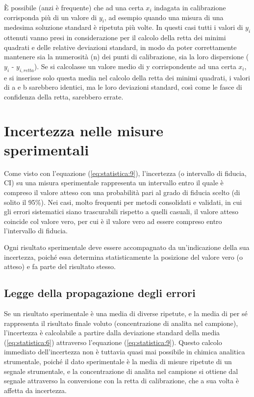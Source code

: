 
È possibile (anzi è frequente) che ad una certa $x_i$ indagata in calibrazione corrisponda più di un valore di $y_i$, ad esempio quando una misura di una medesima soluzione standard è ripetuta più volte. In questi casi tutti i valori di $y_i$ ottenuti vanno presi in considerazione per il calcolo della retta dei minimi quadrati e delle relative deviazioni standard, in modo da poter correttamente mantenere sia la numerosità (n) dei punti di calibrazione, sia la loro dispersione ($y_i$ - $y_{i,retta}$). Se si calcolasse un valore medio di y corrispondente ad una certa $x_i$, e si inserisse solo questa media nel calcolo della retta dei minimi quadrati, i valori di a e b sarebbero identici, ma le loro deviazioni standard, così come le fasce di confidenza della retta, sarebbero errate.

\section{Incertezza nelle misure sperimentali}

Come visto con l'equazione (\ref{eq:statistica:9}), l'incertezza (o intervallo di fiducia, CI) su una misura sperimentale rappresenta un intervallo entro il quale è compreso il valore atteso con una probabilità pari al grado di fiducia scelto (di solito il 95\%). Nei casi, molto frequenti per metodi consolidati e validati, in cui gli errori sistematici siano trascurabili rispetto a quelli casuali, il valore atteso coincide col valore vero, per cui è il valore vero ad essere compreso entro l'intervallo di fiducia.

Ogni risultato sperimentale deve essere accompagnato da un'indicazione della sua incertezza, poiché essa determina statisticamente la posizione del valore vero (o atteso) e fa parte del risultato stesso.

\subsection{Legge della propagazione degli errori}

Se un risultato sperimentale è una media di diverse ripetute, e la media di per sé rappresenta il risultato finale voluto (concentrazione di analita nel campione), l'incertezza è calcolabile a partire dalla deviazione standard della media (\ref{eq:statistica:6}) attraverso l'equazione (\ref{eq:statistica:9}). Questo calcolo immediato dell'incertezza non è tuttavia quasi mai possibile in chimica analitica strumentale, poiché il dato sperimentale è la media di misure ripetute di un segnale strumentale, e la concentrazione di analita nel campione si ottiene dal segnale attraverso la conversione con la retta di calibrazione, che a sua volta è affetta da incertezza.

